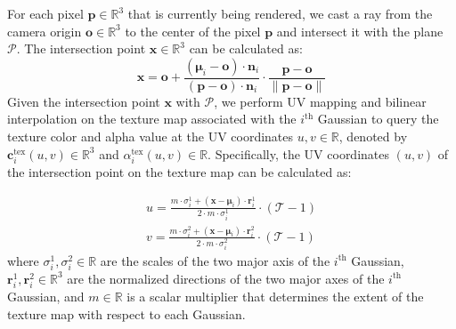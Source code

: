 For each pixel $\mathbf{p} \in \mathbb{R}^3$ that is currently being rendered, we cast a ray from the camera origin $\mathbf{o} \in \mathbb{R}^3$ to the center of the pixel $\mathbf{p}$ and intersect it with the plane $\mathcal{P}$. The intersection point $\mathbf{x} \in \mathbb{R}^3$ can be calculated as:
\begin{equation}
    \mathbf{x} = \mathbf{o} + \frac{(\bm{\mu}_i - \mathbf{o}) \cdot \mathbf{n}_i}{(\mathbf{p} - \mathbf{o}) \cdot \mathbf{n}_i} \cdot \frac{\mathbf{p} - \mathbf{o}}{\|\mathbf{p} - \mathbf{o}\|}
\end{equation}
Given the intersection point $\mathbf{x}$ with $\mathcal{P}$, we perform UV mapping and bilinear interpolation on the texture map associated with the $i^\text{th}$ Gaussian to query the texture color and alpha value at the UV coordinates $u, v \in \mathbb{R}$, denoted by $\mathbf{c}_i^\text{tex}(u, v) \in \mathbb{R}^3$ and $\alpha_i^\text{tex}(u, v) \in \mathbb{R}$. Specifically, the UV coordinates $(u, v)$ of the intersection point on the texture map can be calculated as:

\begin{equation}
\begin{split}
    u = \frac{m\cdot \sigma_i^1 + (\mathbf{x} - \bm{\mu}_i)\cdot \mathbf{r}_i^1}{2\cdot m \cdot \sigma_i^1} \cdot (\mathcal{T} - 1) \\
    v = \frac{m\cdot \sigma_i^2 + (\mathbf{x} - \bm{\mu}_i)\cdot \mathbf{r}_i^2}{2\cdot m \cdot \sigma_i^2} \cdot (\mathcal{T} - 1)
\end{split}
\end{equation}
where $\sigma_i^1, \sigma_i^2 \in \mathbb{R}$ are the scales of the two major axis of the $i^\text{th}$ Gaussian, $\mathbf{r}_i^1, \mathbf{r}_i^2 \in \mathbb{R}^3$ are the normalized directions of the two major axes of the $i^\text{th}$ Gaussian, and $m \in \mathbb{R}$ is a scalar multiplier that determines the extent of the texture map with respect to each Gaussian. 


